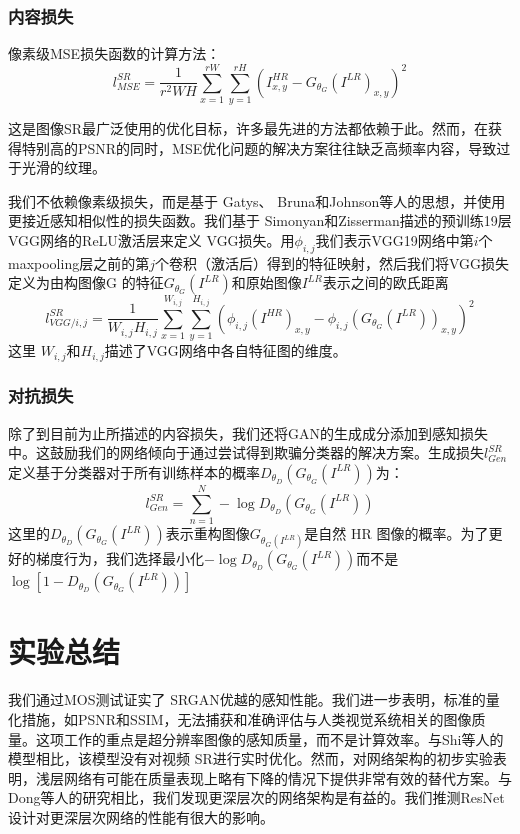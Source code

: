 \documentclass[UTF8,a4paper,10pt]{ctexart}
\begin{document}
\subsubsection{内容损失}
像素级MSE损失函数的计算方法：
\begin{equation}
  l_{MSE}^{SR} = \frac{1}{r^2WH}\sum_{x = 1}^{rW}\sum_{y = 1}^{rH}(I_{x, y}^{HR} - G_{\theta_G}(I^{LR})_{x, y})^2\label{eq:4}
\end{equation}

这是图像SR最广泛使用的优化目标，许多最先进的方法都依赖于此。然而，在获得特别高的PSNR的同时，MSE优化问题的解决方案往往缺乏高频率内容，导致过于光滑的纹理。

我们不依赖像素级损失，而是基于 Gatys、 Bruna和Johnson等人的思想，并使用更接近感知相似性的损失函数。我们基于 Simonyan和Zisserman描述的预训练19层VGG网络的ReLU激活层来定义 VGG损失。用$\phi_{i, j}$我们表示VGG19网络中第$i$个 maxpooling层之前的第$j$个卷积（激活后）得到的特征映射，然后我们将VGG损失定义为由构图像G 的特征$G_{\theta_G}(I^{LR})$和原始图像$I^{LR}$表示之间的欧氏距离
\begin{equation}
  l_{VGG / i, j}^{SR} = \frac{1}{W_{i, j}H_{i, j}}\sum_{x = 1}^{W_{i, j}}\sum_{y = 1}^{H_{i, j}}(\phi_{i, j}(I^{HR})_{x, y} - \phi_{i, j}(G_{\theta_G}(I^{LR}))_{x, y})^2\label{eq:5}
\end{equation}
这里 $W_{i, j}$和$H_{i, j}$描述了VGG网络中各自特征图的维度。

\subsubsection{对抗损失}
除了到目前为止所描述的内容损失，我们还将GAN的生成成分添加到感知损失中。这鼓励我们的网络倾向于通过尝试得到欺骗分类器的解决方案。生成损失$l_{Gen}^{SR}$定义基于分类器对于所有训练样本的概率$D_{\theta_D}(G_{\theta_G}(I^{LR}))$为：
\begin{equation}
  l_{Gen}^{SR} = \sum_{n = 1}^{N} -\log{D_{\theta_D}(G_{\theta_G}(I^{LR}))}\label{eq:6}
\end{equation}
这里的$D_{\theta_D}(G_{\theta_G}(I^{LR}))$表示重构图像$G_{\theta_G(I^{LR})}$是自然 HR 图像的概率。为了更好的梯度行为，我们选择最小化$-\log{D_{\theta_D}(G_{\theta_G}(I^{LR}))}$而不是$\log{[1 - D_{\theta_D}(G_{\theta_G}(I^{LR}))]}$

\section{实验总结}
我们通过MOS测试证实了 SRGAN优越的感知性能。我们进一步表明，标准的量化措施，如PSNR和SSIM，无法捕获和准确评估与人类视觉系统相关的图像质量。这项工作的重点是超分辨率图像的感知质量，而不是计算效率。与Shi等人的模型相比，该模型没有对视频 SR进行实时优化。然而，对网络架构的初步实验表明，浅层网络有可能在质量表现上略有下降的情况下提供非常有效的替代方案。与Dong等人的研究相比，我们发现更深层次的网络架构是有益的。我们推测ResNet 设计对更深层次网络的性能有很大的影响。
\end{document}
